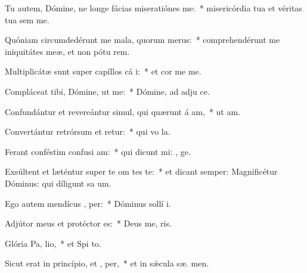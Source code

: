 \item Tu autem, Dómine, ne longe fácias miseratiónes   me:~* misericórdia tua et véritas tua sem  me.
\item Quóniam circumdedérunt me mala, quorum   merus:~* comprehendérunt me iniquitátes meæ, et non pótu  rem.
\item Multiplicátæ sunt super capíllos cá i:~* et cor me  me.
\item Compláceat tibi, Dómine, ut  me:~* Dómine, ad adju  ce.
\item Confundántur et revereántur simul, qui quærunt á am,~* ut  am.
\item Convertántur retrórsum et retur:~* qui vo  la.
\item Ferant conféstim confusi am:~* qui dicunt mi: , ge.
\item Exsúltent et læténtur super te om tes te:~* et dicant semper: Magnificétur Dóminus: qui díligunt sa um.
\item Ego autem mendícus ,  per:~* Dóminus sollí  i.
\item Adjútor meus et protéctor   es:~* Deus me,  ris.
\item Glória Pa,  lio,~* et Spi to.
\item Sicut erat in princípio, et ,  per,~* et in sǽcula sæ. men.
